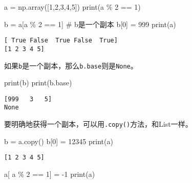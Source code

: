 \documentclass[
  letterpaper,
  DIV=11,
  numbers=noendperiod]{scrreprt}
\newenvironment{Shaded}{\begin{snugshade}}{\end{snugshade}}
\newcommand{\BuiltInTok}[1]{\textcolor[rgb]{0.00,0.23,0.31}{#1}}
\newcommand{\CommentTok}[1]{\textcolor[rgb]{0.37,0.37,0.37}{#1}}
\newcommand{\DecValTok}[1]{\textcolor[rgb]{0.68,0.00,0.00}{#1}}
\newcommand{\NormalTok}[1]{\textcolor[rgb]{0.00,0.23,0.31}{#1}}
\newcommand{\OperatorTok}[1]{\textcolor[rgb]{0.37,0.37,0.37}{#1}}
\begin{document}
\begin{Shaded}
\begin{Highlighting}[]
\NormalTok{a }\OperatorTok{=}\NormalTok{ np.array([}\DecValTok{1}\NormalTok{,}\DecValTok{2}\NormalTok{,}\DecValTok{3}\NormalTok{,}\DecValTok{4}\NormalTok{,}\DecValTok{5}\NormalTok{])}
\BuiltInTok{print}\NormalTok{(a }\OperatorTok{\%} \DecValTok{2} \OperatorTok{==} \DecValTok{1}\NormalTok{)}

\NormalTok{b }\OperatorTok{=}\NormalTok{ a[a }\OperatorTok{\%} \DecValTok{2} \OperatorTok{==} \DecValTok{1}\NormalTok{] }\CommentTok{\# b是一个副本}
\NormalTok{b[}\DecValTok{0}\NormalTok{] }\OperatorTok{=} \DecValTok{999}
\BuiltInTok{print}\NormalTok{(a)}
\end{Highlighting}
\end{Shaded}

\begin{verbatim}
[ True False  True False  True]
[1 2 3 4 5]
\end{verbatim}

如果\texttt{b}是一个副本，那么\texttt{b.base}则是\texttt{None}。

\begin{Shaded}
\begin{Highlighting}[]
\BuiltInTok{print}\NormalTok{(b)}
\BuiltInTok{print}\NormalTok{(b.base) }
\end{Highlighting}
\end{Shaded}

\begin{verbatim}
[999   3   5]
None
\end{verbatim}

要明确地获得一个副本，可以用\texttt{.copy()}方法，和List一样。

\begin{Shaded}
\begin{Highlighting}[]
\NormalTok{b }\OperatorTok{=}\NormalTok{ a.copy()}
\NormalTok{b[}\DecValTok{0}\NormalTok{] }\OperatorTok{=} \DecValTok{12345}
\BuiltInTok{print}\NormalTok{(a)}
\end{Highlighting}
\end{Shaded}

\begin{verbatim}
[1 2 3 4 5]
\end{verbatim}

\begin{Shaded}
\begin{Highlighting}[]
\NormalTok{a[ a }\OperatorTok{\%} \DecValTok{2} \OperatorTok{==} \DecValTok{1}\NormalTok{] }\OperatorTok{=} \OperatorTok{{-}}\DecValTok{1}
\BuiltInTok{print}\NormalTok{(a)}
\end{Highlighting}
\end{Shaded}
\end{document}
